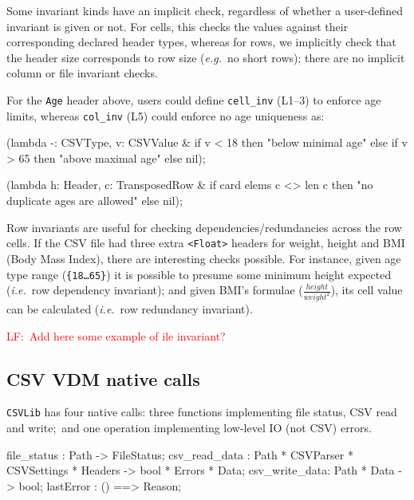 \documentclass[runningheads,a4paper]{llncs}
\newcommand{\lfcomment}[1]{{\scriptsize\textcolor{red}{LF:~#1}}}  %
\begin{document}
Some invariant kinds have an implicit check, regardless of whether a user-defined invariant is given or not. For cells, this checks the values against their corresponding declared header types, whereas for rows, we implicitly check that the header size corresponds to row size (\textit{e.g.}~no short rows); there are no implicit column or file invariant checks. 

For the \texttt{Age} header above, users could define \texttt{cell\_inv} (L1--3) to enforce age limits, whereas \texttt{col\_inv} (L5) could enforce no age uniqueness as:
%
\begin{vdmsl}[frame=none,basicstyle=\ttfamily\scriptsize,numbers=left,caption={Cell and Column Invariant Definitions},label={lst:CSVInvs}]
    (lambda -: CSVType, v: CSVValue & 
        if v < 18 then "below minimal age" else
        if v > 65 then "above maximal age" else nil);

    (lambda h: Header, c: TransposedRow & 
        if card elems c <> len c then "no duplicate ages are allowed" else nil);
\end{vdmsl}
%
Row invariants are useful for checking dependencies/redundancies across the row cells. If the CSV file had three extra \texttt{<Float>} headers for weight, height and BMI (Body Mass Index), there are interesting checks possible. For instance, given age type range (\texttt{\{18\ldots 65\}}) it is possible to presume some minimum height expected (\textit{i.e.}~row dependency invariant); and given BMI's formulae (\(\frac{height}{weight^2}\)), its cell value can be calculated (\textit{i.e.}~row redundancy invariant).     

\lfcomment{Add here some example of ile invariant? }

\subsection*{CSV VDM native calls}\label{subsec:VDMnative}

\texttt{CSVLib} has four native calls: three functions implementing file status, CSV read and write;~and one operation implementing low-level IO (not CSV) errors.   
%
\begin{vdmsl}[frame=none,basicstyle=\ttfamily\scriptsize]
    file_status   : Path -> FileStatus;
    csv_read_data : Path * CSVParser * CSVSettings * Headers -> 
                    bool * Errors * Data;
    csv_write_data: Path * Data -> bool;
    lastError     : () ==> Reason;
\end{vdmsl} 
\end{document}
